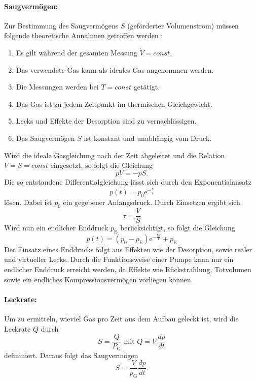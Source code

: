  \paragraph{Saugvermögen:}
 Zur Bestimmung des Saugvermögens $S$ (geförderter Volumenstrom) müssen folgende theoretische Annahmen getroffen werden \cite{anleitung}:
 \begin{enumerate}
   \item Es gilt während der gesamten Messung $\dot{V} = const$.
   \item Das verwendete Gas kann als ideales Gas angenommen werden.
   \item Die Messungen werden bei $T = const$ getätigt.
   \item Das Gas ist zu jedem Zeitpunkt im thermischen Gleichgewicht.
   \item Lecks und Effekte der Desorption sind zu vernachlässigen.
   \item Das Saugvermögen $S$ ist konstant und unabhängig vom Druck.
 \end{enumerate}
Wird die ideale Gasgleichung nach der Zeit abgeleitet und die Relation $\dot{V} = S = const$ eingesetzt,
so folgt die Gleichung
\begin{equation}
  \dot{p}V = -pS.
\end{equation}
Die so entstandene Differentialgleichung lässt sich durch den Exponentialansatz
\begin{equation}
  p(t) = p_0 \text{e}^{-\frac{t}{\tau}}
\end{equation}
lösen. Dabei ist $p_0$ ein gegebener Anfangsdruck. Durch Einsetzen ergibt sich
\begin{equation}
  \tau = \frac{V}{S}
\end{equation}
Wird nun ein endlicher Enddruck $p_\text{E}$ berücksichtigt, so folgt die Gleichung
\begin{equation}
  p(t) = (p_0 - p_\text{E})\text{e}^{-\frac{tS}{V}}+p_\text{E}
  \label{eqn:druck}
\end{equation}
Der Einsatz eines Enddrucks folgt aus Effekten wie der Desorption, sowie realer und virtueller Lecks. Durch die Funktionsweise einer Pumpe kann nur ein
endlicher Enddruck erreicht werden, da Effekte wie Rückstrahlung, Totvolumen sowie ein endliches Kompressionsvermögen vorliegen können.

\paragraph{Leckrate:}
Um zu ermitteln, wieviel Gas pro Zeit aus dem Aufbau geleckt ist, wird die Leckrate $Q$ durch
\begin{equation}
  S  = \frac{Q}{P_\text{G}} \text{ mit } Q = V\,\frac{dp}{dt}
\end{equation}
 defininiert. Daraus folgt das Saugvermögen
 \begin{equation}
   S = \frac{V}{p_\text{G}}\frac{dp}{dt}.
   \label{eqn:Saug}
 \end{equation}

